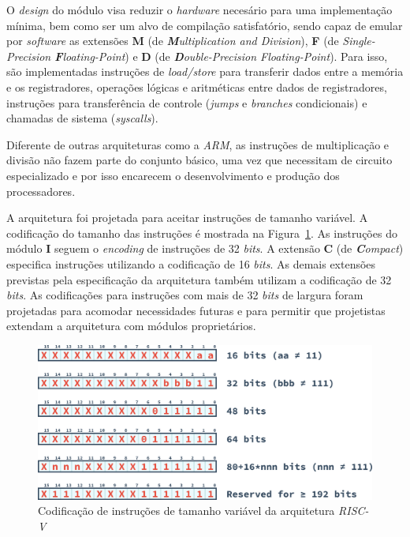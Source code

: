 { O \textit{design} do módulo visa reduzir o \textit{hardware} necesário para
    uma implementação mínima, bem como ser um alvo de compilação satisfatório,
    sendo capaz de emular por \textit{software} as extensões \textbf{M}
    (de \textit{\textbf{M}ultiplication and Division}), \textbf{F} (de
    \textit{Single-Precision \textbf{F}loating-Point}) e \textbf{D} (de
    \textit{\textbf{D}ouble-Precision Floating-Point}). Para isso, são
    implementadas instruções de \textit{load/store} para transferir dados
    entre a memória e os registradores, operações lógicas e aritméticas
    entre dados de registradores, instruções para transferência de controle
    (\textit{jumps} e \textit{branches} condicionais) e chamadas de sistema
    (\textit{syscalls}).
}

{ Diferente de outras arquiteturas como a \textit{ARM}, as instruções de
    multiplicação e divisão não fazem parte do conjunto básico, uma vez que
    necessitam de circuito especializado e por isso encarecem o desenvolvimento
    e produção dos processadores.
}

{ A arquitetura foi projetada para aceitar instruções de tamanho variável.
    A codificação do tamanho das instruções é mostrada na
    Figura~\ref{fig:riscv_var_length}. As instruções do módulo \textbf{I}
    seguem o \textit{encoding} de instruções de 32 \textit{bits}. A extensão
    \textbf{C} (de \textit{\textbf{C}ompact}) especifica instruções utilizando
    a codificação de 16 \textit{bits}. As demais extensões previstas pela
    especificação da arquitetura também utilizam a codificação de 32
    \textit{bits}. As codificações para instruções com mais de 32
    \textit{bits} de largura foram projetadas para acomodar necessidades
    futuras e para permitir que projetistas extendam a arquitetura com módulos
    proprietários.
}

\begin{figure}[H]
\centering
    \includegraphics[width=.8\linewidth]
    {../images/instructions/rv_encoding.png}
    \caption{Codificação de instruções de tamanho variável da arquitetura
                \textit{RISC-V}}\label{fig:riscv_var_length}
\end{figure}


